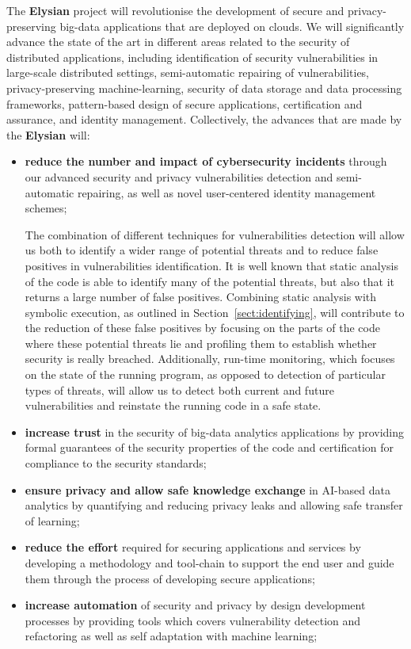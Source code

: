 \documentclass[a4paper,11pt]{article}
\newcommand{\project}[1]{\textbf{#1}\xspace}
\newcommand{\SECURITY}{\project{Elysian}}
\newcommand{\TheProject}{\SECURITY}
\begin{document}
The \TheProject{} project will revolutionise the development of secure and privacy-preserving big-data applications that are deployed on clouds. We will significantly advance the state of the art in different areas related to the security of distributed applications, including identification of security vulnerabilities in large-scale distributed settings, semi-automatic repairing of vulnerabilities, privacy-preserving machine-learning, security of data storage and data processing frameworks, pattern-based design of secure applications, certification and assurance, and identity management. Collectively, the advances that are made by the \TheProject{} will:
\begin{itemize}
\item \textbf{reduce the number and impact of cybersecurity incidents} through our advanced security and privacy vulnerabilities detection and semi-automatic repairing, as well as novel user-centered identity management schemes;

\begin{mdframed}[backgroundcolor=blue!5]
The combination of different techniques for vulnerabilities detection will allow us both to identify a wider range of potential threats and to reduce false positives in vulnerabilities identification. It is well known that static analysis of the code is able to identify many of the potential threats, but also that it returns a large number of false positives. Combining static analysis with symbolic execution, as outlined in Section~\ref{sect:identifying}, will contribute to the reduction of these false positives by focusing on the parts of the code where these potential threats lie and profiling them to establish whether security is really breached. Additionally, run-time monitoring, which focuses on the state of the running program, as opposed to detection of particular types of threats, will allow us to detect both current and future vulnerabilities and reinstate the running code in a safe state.
\end{mdframed}

\item \textbf{increase trust} in the security of big-data analytics applications by providing formal guarantees of the security properties of the code and certification for compliance to the security standards;
\item \textbf{ensure privacy and allow safe knowledge exchange} in AI-based data analytics by quantifying and reducing privacy leaks and allowing safe transfer of learning;
\item \textbf{reduce the effort} required for securing applications and services by developing a methodology and tool-chain to support the end user and guide them through the process of developing secure applications;
\item \textbf{increase automation}  of security and privacy by design development processes by providing tools which covers vulnerability detection and refactoring as well as self adaptation with machine learning;


\end{itemize}
\end{document}
